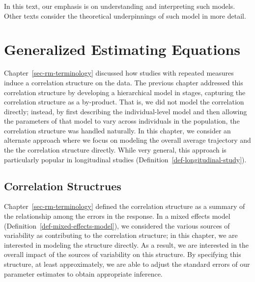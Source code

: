 \documentclass[
  letterpaper,
  DIV=11,
  numbers=noendperiod]{scrreprt}
\theoremstyle{definition}
\theoremstyle{definition}
\theoremstyle{remark}
\begin{document}
In this text, our emphasis is on understanding and interpreting such
models. Other texts consider the theoretical underpinnings of such model
in more detail.

\hypertarget{sec-rm-gee}{%
\chapter{Generalized Estimating Equations}\label{sec-rm-gee}}

\providecommand{\norm}[1]{\left\lVert#1\right\rVert}
\providecommand{\abs}[1]{\left\lvert#1\right\rvert}
\providecommand{\dist}[1]{\stackrel{\text{#1}}{\sim}}
\providecommand{\ind}[1]{\mathbb{I}\left(#1\right)}
\providecommand{\bm}[1]{\mathbf{#1}}
\providecommand{\bs}[1]{\boldsymbol{#1}}
\providecommand{\Ell}{\mathcal{L}}
\providecommand{\indep}{\perp\negthickspace\negmedspace\perp}

Chapter~\ref{sec-rm-terminology} discussed how studies with repeated
measures induce a correlation structure on the data. The previous
chapter addressed this correlation structure by developing a
hierarchical model in stages, capturing the correlation structure as a
by-product. That is, we did not model the correlation directly; instead,
by first describing the individual-level model and then allowing the
parameters of that model to vary across individuals in the population,
the correlation structure was handled naturally. In this chapter, we
consider an alternate approach where we focus on modeling the overall
average trajectory and the the correlation structure directly. While
very general, this approach is particularly popular in longitudinal
studies (Definition~\ref{def-longitudinal-study}).

\hypertarget{correlation-structrues}{%
\section{Correlation Structrues}\label{correlation-structrues}}

Chapter~\ref{sec-rm-terminology} defined the correlation structure as a
summary of the relationship among the errors in the response. In a mixed
effects model (Definition~\ref{def-mixed-effects-model}), we considered
the various sources of variability as contributing to the correlation
structure; in this chapter, we are interested in modeling the structure
directly. As a result, we are interested in the overall impact of the
sources of variability on this structure. By specifying this structure,
at least approximately, we are able to adjust the standard errors of our
parameter estimates to obtain appropriate inference.
\end{document}

